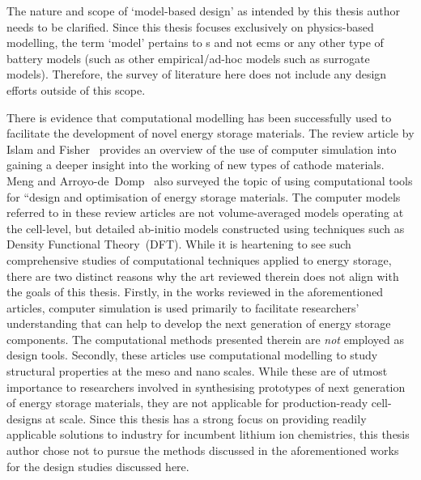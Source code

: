 The nature and  scope of `model-based design' as intended  by this thesis author
needs to  be clarified. Since  this thesis focuses exclusively  on physics-based
modelling, the term  `model' pertains to s and  not \glspl{ecm} or
any other type of battery models  (such as other empirical/ad-hoc models such as
surrogate models). Therefore, the survey of literature here does not include any
design efforts outside of this scope.

There is  evidence that  computational modelling has  been successfully  used to
facilitate the development of novel energy storage materials. The review article
by Islam and Fisher~\cite{Islam2014} provides an overview of the use of computer
simulation  into gaining  a deeper  insight  into the  working of  new types  of
cathode  materials. Meng  and Arroyo-de~Domp~\cite{Meng2009}  also surveyed  the
topic  of using  computational tools  for  ``design and  optimisation of  energy
storage materials. The computer models referred  to in these review articles are
not volume-averaged models  operating at the cell-level,  but detailed ab-initio
models  constructed using  techniques such  as Density  Functional Theory~(DFT).
While  it is  heartening  to  see such  comprehensive  studies of  computational
techniques applied to energy storage, there are two distinct reasons why the art
reviewed therein does not  align with the goals of this  thesis. Firstly, in the
works  reviewed in  the  aforementioned articles,  computer  simulation is  used
primarily  to facilitate  researchers' understanding  that can  help to  develop
the  next generation  of energy  storage components.  The computational  methods
presented  therein are  \emph{not}  employed as  design  tools. Secondly,  these
articles use computational modelling to  study structural properties at the meso
and nano scales. While these are of utmost importance to researchers involved in
synthesising prototypes of next generation of energy storage materials, they are
not applicable for production-ready cell-designs at scale. Since this thesis has
a  strong  focus on  providing  readily  applicable  solutions to  industry  for
incumbent lithium  ion chemistries, this thesis  author chose not to  pursue the
methods discussed in  the aforementioned works for the  design studies discussed
here.

